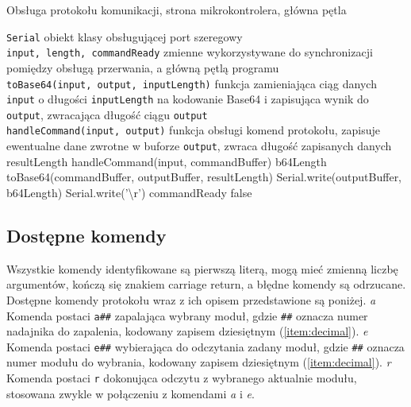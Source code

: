 \begin{algorithm}
\caption{Obsługa protokołu komunikacji, strona mikrokontrolera, główna pętla}
\label{alg:proto_uc_main}
\begin{algorithmic}[1]
  \REQUIRE \texttt{Serial} \ppauza obiekt klasy obsługującej port szeregowy\\
  \texttt{input, length, commandReady} \ppauza zmienne wykorzystywane do synchronizacji pomiędzy obsługą przerwania, a główną pętlą programu\\
  \texttt{toBase64(input, output, inputLength)} \ppauza funkcja zamieniająca ciąg danych \texttt{input} o długości \texttt{inputLength} na kodowanie Base64 i zapisująca wynik do \texttt{output}, zwracająca długość ciągu \texttt{output}\\
  \texttt{handleCommand(input, output)} \ppauza funkcja obsługi komend protokołu, zapisuje ewentualne dane zwrotne w buforze \texttt{output}, zwraca długość zapisanych danych
      \STATE resultLength \textleftarrow{} handleCommand(input, commandBuffer)
      \STATE b64Length \textleftarrow{} toBase64(commandBuffer, outputBuffer, resultLength)
      \STATE Serial.write(outputBuffer, b64Length)
      \STATE Serial.write('\textbackslash{}r')
      \STATE commandReady \textleftarrow{} false
    \ENDIF
  \ENDWHILE
\end{algorithmic}
\end{algorithm}

\subsection{Dostępne komendy}\label{sec:commands}

Wszystkie komendy identyfikowane są pierwszą literą, mogą mieć zmienną liczbę argumentów, kończą się znakiem carriage return, a błędne komendy są odrzucane.
Dostępne komendy protokołu wraz z ich opisem przedstawione są poniżej.
\newline
\newline
\textsl{a}
Komenda postaci \texttt{a\#\#} zapalająca wybrany moduł, gdzie \texttt{\#\#} oznacza numer nadajnika do zapalenia, kodowany zapisem dziesiętnym (\ref{item:decimal}).
\newline
\newline
\textsl{e}
Komenda postaci \texttt{e\#\#} wybierająca do odczytania zadany moduł, gdzie \texttt{\#\#} oznacza numer modułu do wybrania, kodowany zapisem dziesiętnym (\ref{item:decimal}).
\newline
\newline
\textsl{r}
Komenda postaci \texttt{r} dokonująca odczytu z wybranego aktualnie modułu, stosowana zwykle w połączeniu z komendami \textsl{a} i \textsl{e}.

